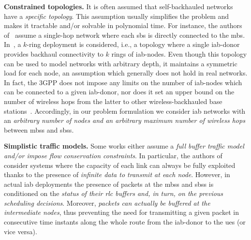 \textbf{Constrained topologies.} It is often assumed that self-backhauled networks have a \textit{specific topology}. This assumption usually simplifies the problem and makes it tractable and/or solvable in polynomial time. For instance, the authors of~\cite{kwon2019joint, pizzo2017optimal, lei2020deep} assume a single-hop network where each \gls{sbs} is directly connected to the \gls{mbs}. In~\cite{kulkarni2018max}, a $k$-ring deployment is considered, i.e., a topology where a single \gls{iab}-donor provides backhaul connectivity to $k$ rings of \gls{iab}-nodes. Even though this topology can be used to model networks with arbitrary depth, it maintains a symmetric load for each node, an assumption which generally does not hold in real networks.
In fact, the 3GPP does not impose any limits on the number of \gls{iab}-nodes which can be connected to a given \gls{iab}-donor, nor does it set an upper bound on the number of wireless hops from the latter to other wireless-backhauled base stations~\cite{3gpp_38_874}. Accordingly, in our problem formulation we consider \gls{iab} networks with an \textit{arbitrary number of nodes and an arbitrary maximum number of wireless hops} between \glspl{mbs} and \glspl{sbs}. 

\textbf{Simplistic traffic models.} Some works either assume a \textit{full buffer traffic model and/or impose flow conservation constraints}. In particular, the authors of~\cite{yuan2018optimal, rasekh2015interference} consider systems where the capacity of each link can  always be fully exploited thanks to the presence of \textit{infinite data to transmit at each node}. However, in actual \gls{iab} deployments the presence of packets at the \glspl{mbs} and \glspl{sbs} is conditioned on the \textit{status of their \gls{rlc} buffers and, in turn, on the previous scheduling decisions}. Moreover, \textit{packets can actually be buffered at the intermediate nodes}, thus preventing the need for transmitting a given packet in consecutive time instants along the whole route from the \gls{iab}-donor to the \glspl{ue} (or vice versa). 

